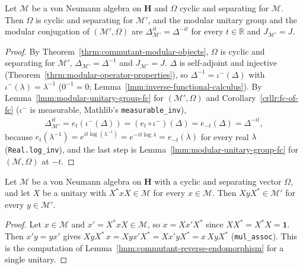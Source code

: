 \begin{lemma}
    \label{lmm:commutant-modular-unitary-group}
    \leanok
    Let $\mathcal{M}$ be a von Neumann algebra on $\mathbf{H}$ and $\Omega$ cyclic and separating for $\mathcal{M}$. Then $\Omega$ is cyclic and separating for $\mathcal{M}'$, and the modular unitary group and the modular conjugation of $(\mathcal{M}', \Omega)$ are $\Delta_{\mathcal{M}'}^{it} = \Delta^{-it}$ for every $t \in \mathbb{R}$ and $J_{\mathcal{M}'} = J$.
\end{lemma}
\begin{proof}
    \leanok
    By Theorem~\ref{thrm:commutant-modular-objects}, $\Omega$ is cyclic and separating for $\mathcal{M}'$, $\Delta_{\mathcal{M}'} = \Delta^{-1}$ and $J_{\mathcal{M}'} = J$. $\Delta$ is self-adjoint and injective (Theorem~\ref{thrm:modular-operator-properties}), so $\Delta^{-1} = \iota^{-}(\Delta)$ with $\iota^{-}(\lambda) = \lambda^{-1}$ ($0^{-1} = 0$; Lemma~\ref{lmm:inverse-functional-calculus}). By Lemma~\ref{lmm:modular-unitary-group-fc} for $(\mathcal{M}', \Omega)$ and Corollary~\ref{crllr:fc-of-fc} ($\iota^{-}$ is measurable, Mathlib's \texttt{measurable\_inv}),
    \begin{align}
        \Delta_{\mathcal{M}'}^{it} = e_t(\iota^{-}(\Delta)) = (e_t \circ \iota^{-})(\Delta) = e_{-t}(\Delta) = \Delta^{-it},
    \end{align}
    because $e_t(\lambda^{-1}) = e^{it\log(\lambda^{-1})} = e^{-it\log\lambda} = e_{-t}(\lambda)$ for every real $\lambda$ (\texttt{Real.log\_inv}), and the last step is Lemma~\ref{lmm:modular-unitary-group-fc} for $(\mathcal{M}, \Omega)$ at $-t$.
\end{proof}

\begin{lemma}
    \label{lmm:unitary-reverse-endomorphism-commutant}
    \leanok
    Let $\mathcal{M}$ be a von Neumann algebra on $\mathbf{H}$ with a cyclic and separating vector $\Omega$, and let $X$ be a unitary with $X^*xX \in \mathcal{M}$ for every $x \in \mathcal{M}$. Then $XyX^* \in \mathcal{M}'$ for every $y \in \mathcal{M}'$.
\end{lemma}
\begin{proof}
    \leanok
    Let $x \in \mathcal{M}$ and $x' = X^*xX \in \mathcal{M}$, so $x = Xx'X^*$ since $XX^* = X^*X = \mathbf{1}$. Then $x'y = yx'$ gives $XyX^*\,x = Xyx'X^* = Xx'yX^* = x\,XyX^*$ (\texttt{mul\_assoc}). This is the computation of Lemma~\ref{lmm:commutant-reverse-endomorphism} for a single unitary.
\end{proof}

